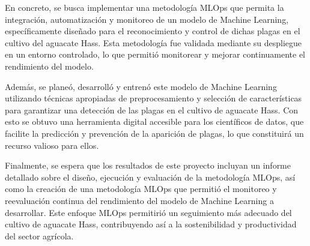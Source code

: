 \begin{enumerate}
    En concreto, se busca implementar una metodología MLOps que permita la integración, automatización y monitoreo de un modelo de Machine Learning, específicamente diseñado para el reconocimiento y control de dichas plagas en el cultivo del aguacate Hass. Esta metodología fue validada mediante  su despliegue en un entorno controlado, lo que permitió monitorear y mejorar continuamente el rendimiento del modelo.

    Además, se planeó, desarrolló y entrenó este modelo de Machine Learning utilizando técnicas apropiadas de preprocesamiento y selección de características para garantizar una detección de las plagas en el cultivo de aguacate Hass. Con esto se obtuvo una herramienta digital accesible para los científicos de datos, que facilite la predicción y prevención de la aparición de plagas, lo que constituirá un recurso valioso para ellos.

    Finalmente, se espera que los resultados de este proyecto incluyan un informe detallado sobre el diseño, ejecución y evaluación de la metodología MLOps, así como la creación de una metodología MLOps que permitió el monitoreo y reevaluación continua del rendimiento del modelo de Machine Learning a desarrollar. Este enfoque MLOps permitirió un seguimiento más adecuado del cultivo de aguacate Hass, contribuyendo así a la sostenibilidad y productividad del sector agrícola.
\end{enumerate}
